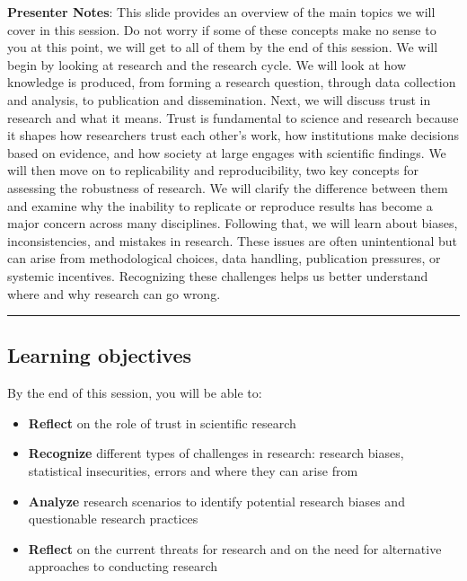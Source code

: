 \documentclass[
  english,
  letterpaper,
  DIV=11,
  numbers=noendperiod]{scrartcl}
\providecommand{\tightlist}{%
  \setlength{\itemsep}{0pt}\setlength{\parskip}{0pt}}
\begin{document}
\textbf{Presenter Notes}: This slide provides an overview of the main
topics we will cover in this session. Do not worry if some of these
concepts make no sense to you at this point, we will get to all of them
by the end of this session. We will begin by looking at research and the
research cycle. We will look at how knowledge is produced, from forming
a research question, through data collection and analysis, to
publication and dissemination. Next, we will discuss trust in research
and what it means. Trust is fundamental to science and research because
it shapes how researchers trust each other's work, how institutions make
decisions based on evidence, and how society at large engages with
scientific findings. We will then move on to replicability and
reproducibility, two key concepts for assessing the robustness of
research. We will clarify the difference between them and examine why
the inability to replicate or reproduce results has become a major
concern across many disciplines. Following that, we will learn about
biases, inconsistencies, and mistakes in research. These issues are
often unintentional but can arise from methodological choices, data
handling, publication pressures, or systemic incentives. Recognizing
these challenges helps us better understand where and why research can
go wrong.

\begin{center}\rule{0.5\linewidth}{0.5pt}\end{center}

\subsection{Learning objectives}\label{learning-objectives}

By the end of this session, you will be able to:

\begin{itemize}
\tightlist
\item
  \textbf{Reflect} on the role of trust in scientific research
\item
  \textbf{Recognize} different types of challenges in research: research
  biases, statistical insecurities, errors and where they can arise from
\item
  \textbf{Analyze} research scenarios to identify potential research
  biases and questionable research practices
\item
  \textbf{Reflect} on the current threats for research and on the need
  for alternative approaches to conducting research
\end{itemize}
\end{document}
